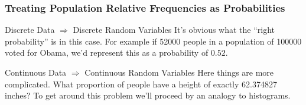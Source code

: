 \begin{frame}
\frametitle{Treating Population Relative Frequencies as Probabilities}
 
\begin{block}{Discrete Data $\Rightarrow$ Discrete Random Variables}
It's obvious what the ``right probability'' is in this case. For example if 52000 people in a population of 100000 voted for Obama, we'd represent this as a probability of $0.52$.
\end{block}

 
\begin{block}{Continuous Data $\Rightarrow$ Continuous Random Variables}
Here things are more complicated. What proportion of people have a height of exactly 62.374827 inches? To get around this problem we'll proceed by an analogy to histograms.
\end{block}

\end{frame}


